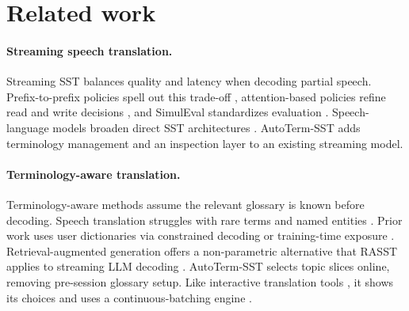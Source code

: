\section{Related work}

\paragraph{Streaming speech translation.}
Streaming SST balances quality and latency when decoding partial speech.
Prefix-to-prefix policies spell out this trade-off \citep{ma2019stacl},
attention-based policies refine read and write decisions
\citep{papi2023alignatt,papi2024streamatt}, and SimulEval standardizes
evaluation \citep{ma2020simuleval}. Speech-language models broaden direct SST
architectures \citep{seamless2023,zhang2024streamspeech,xu2025qwen3omni}.
AutoTerm-SST adds terminology management and an inspection layer to an
existing streaming model.

\paragraph{Terminology-aware translation.}
Terminology-aware methods assume the relevant glossary is known before decoding. Speech
translation struggles with rare terms and named entities \citep{gaido2021moby}.
Prior work uses user dictionaries via constrained decoding or training-time
exposure \citep{hokamp2017lexically,dinu2019training}. Retrieval-augmented
generation offers a non-parametric alternative
\citep{lewis2020retrieval,khandelwal2021nearest} that RASST applies to
streaming LLM decoding \citep{luo2026rasst}. AutoTerm-SST selects topic slices
online, removing pre-session glossary setup. Like interactive translation
tools \citep{dandekar2024translation}, it shows its choices and uses a
continuous-batching engine \citep{kwon2023efficient,zheng2024sglang}.
